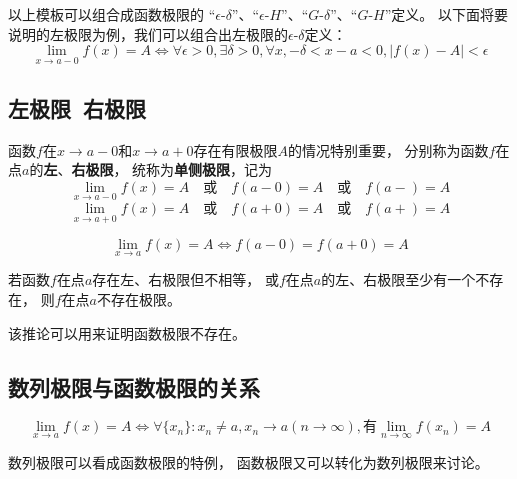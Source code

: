 以上模板可以组合成函数极限的
``$\epsilon$-$\delta$''、``$\epsilon$-$H$''、``$G$-$\delta$''、``$G$-$H$''定义。
以下面将要说明的左极限为例，我们可以组合出左极限的$\epsilon$-$\delta$定义：
\begin{displaymath}
  \lim_{x\to a-0}f(x)=A
  \iff \forall\epsilon>0,\exists\delta>0,\forall x, -\delta<x-a<0, |f(x)-A|<\epsilon
\end{displaymath}

\subsection{左极限\ 右极限}
函数$f$在$x\to a-0$和$x\to a+0$存在有限极限$A$的情况特别重要，
分别称为函数$f$在点$a$的\textbf{左}、\textbf{右极限}，
统称为\textbf{单侧极限}，记为
\begin{displaymath}
  \lim_{x\to a-0}f(x)=A\quad\text{或}\quad f(a-0)=A\quad\text{或}\quad f(a-)=A
\end{displaymath}
\begin{displaymath}
\lim_{x\to a+0}f(x)=A\quad\text{或}\quad f(a+0)=A\quad\text{或}\quad f(a+)=A
\end{displaymath}

\begin{theorem}[函数极限与单侧极限的关系]
  \begin{displaymath}
    \lim_{x\to a}f(x)=A \iff f(a-0)=f(a+0)=A
  \end{displaymath}
\end{theorem}

\begin{corollary}
  若函数$f$在点$a$存在左、右极限但不相等，
  或$f$在点$a$的左、右极限至少有一个不存在，
  则$f$在点$a$不存在极限。
\end{corollary}
\begin{remark}
  该推论可以用来证明函数极限不存在。
\end{remark}

\subsection{数列极限与函数极限的关系}
\begin{theorem}[数列极限与函数极限的关系]
  \begin{displaymath}
    \lim_{x\to a} f(x) = A
    \iff \forall \{x_n\}: x_n\neq a, x_n\to a(n\to\infty),
    \text{有}\lim_{n\to\infty} f(x_n) = A
  \end{displaymath}
\end{theorem}
\begin{remark}
  数列极限可以看成函数极限的特例，
  函数极限又可以转化为数列极限来讨论。
\end{remark}

